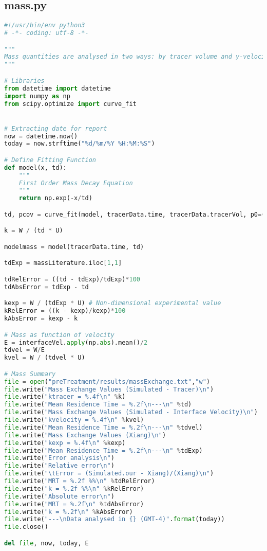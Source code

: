 \subsection{mass.py}
\begin{lstlisting}[language=python]
#!/usr/bin/env python3
# -*- coding: utf-8 -*-

"""
Mass quantities are analysed in two ways: by tracer volume and y-velocity
"""

# Libraries
from datetime import datetime
import numpy as np
from scipy.optimize import curve_fit


# Extracting date for report
now = datetime.now()
today = now.strftime("%d/%m/%Y %H:%M:%S")

# Define Fitting Function
def model(x, td):
    """
    First Order Mass Decay Equation
    """
    return np.exp(-x/td)

td, pcov = curve_fit(model, tracerData.time, tracerData.tracerVol, p0=(120))

k = W / (td * U)

modelmass = model(tracerData.time, td)

tdExp = massLiterature.iloc[1,1]

tdRelError = ((td - tdExp)/tdExp)*100
tdAbsError = tdExp - td

kexp = W / (tdExp * U) # Non-dimensional experimental value
kRelError = ((k - kexp)/kexp)*100
kAbsError = kexp - k

# Mass as function of velocity
E = interfaceVel.apply(np.abs).mean()/2
tdvel = W/E
kvel = W / (tdvel * U)

# Mass Summary
file = open("preTreatment/results/massExchange.txt","w")
file.write("Mass Exchange Values (Simulated - Tracer)\n")
file.write("ktracer = %.4f\n" %k)
file.write("Mean Residence Time = %.2f\n---\n" %td)
file.write("Mass Exchange Values (Simulated - Interface Velocity)\n")
file.write("kvelocity = %.4f\n" %kvel)
file.write("Mean Residence Time = %.2f\n---\n" %tdvel)
file.write("Mass Exchange Values (Xiang)\n")
file.write("kexp = %.4f\n" %kexp)
file.write("Mean Residence Time = %.2f\n---\n" %tdExp)
file.write("Error analysis\n")
file.write("Relative error\n")
file.write("\tError = (Simulated.our - Xiang)/(Xiang)\n")
file.write("MRT = %.2f %%\n" %tdRelError)
file.write("k = %.2f %%\n" %kRelError)
file.write("Absolute error\n")
file.write("MRT = %.2f\n" %tdAbsError)
file.write("k = %.2f\n" %kAbsError)
file.write("---\nData analysed in {} (GMT-4)".format(today))
file.close()

del file, now, today, E
\end{lstlisting}
